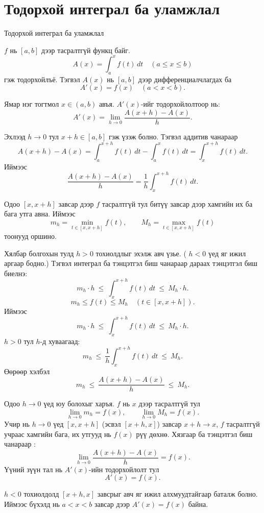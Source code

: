 \section{Тодорхой интеграл ба уламжлал}
\begin{frame}[allowframebreaks]{Тодорхой интеграл ба уламжлал}
\begin{theorem}
$f$ нь $[a,b]$ дээр тасралтгүй функц байг. 
\[
A(x)=\int_a^x f(t)\,dt \quad (a\le x\le b)
\]
гэж тодорхойлъё. Тэгвэл $A(x)$ нь $[a,b]$ дээр дифференциалчлагдах ба
\[
A'(x)=f(x)\quad (a<x<b).
\]
\end{theorem}

\begin{prof}
Ямар нэг тогтмол $x\in(a,b)$ авъя. $A'(x)$-ийг тодорхойлолтоор нь:
\[
A'(x)=\lim_{h\to0}\frac{A(x+h)-A(x)}{h}.
\]

Эхлээд $h\to 0$ тул $x+h\in[a,b]$ гэж үзэж болно. Тэгвэл аддитив чанараар
\[
A(x+h)-A(x)
= \int_a^{x+h} f(t)\,dt - \int_a^x f(t)\,dt
= \int_x^{x+h} f(t)\,dt.
\]
Иймээс
\[
\frac{A(x+h)-A(x)}{h}
=
\frac{1}{h}\int_x^{x+h} f(t)\,dt.
\]

Одоо $[x,x+h]$ завсар дээр $f$ тасралтгүй тул битүү завсар дээр хамгийн их ба бага утга авна. Иймээс
\[
m_h=\min_{t\in[x,x+h]} f(t),\qquad M_h=\max_{t\in[x,x+h]} f(t)
\]
тоонууд оршино.

Хялбар болгохын тулд $h>0$ тохиолдлыг эхэлж авч үзье. ( $h<0$ үед яг ижил аргаар бодно.) Тэгвэл интеграл ба тэнцэтгэл биш чанараар дараах тэнцэтгэл биш биелнэ:
\[
m_h\cdot h
\ \le\
\int_x^{x+h} f(t)\,dt
\ \le\
M_h\cdot h.
\]
\[
m_h \le f(t)\le M_h \quad (t\in[x,x+h]).
\]
Иймээс
\[
m_h\cdot h
\ \le\
\int_x^{x+h} f(t)\,dt
\ \le\
M_h\cdot h.
\]
$h>0$ тул $h$-д хуваагаад:
\[
m_h
\ \le\
\frac{1}{h}\int_x^{x+h} f(t)\,dt
\ \le\
M_h.
\]
Өөрөөр хэлбэл
\[
m_h
\ \le\
\frac{A(x+h)-A(x)}{h}
\ \le\
M_h.
\]

Одоо $h\to0$ үед юу болохыг харъя. $f$ нь $x$ дээр тасралтгүй тул
\[
\lim_{h\to0} m_h = f(x),\qquad \lim_{h\to0} M_h = f(x).
\]
Учир нь $h\to0$ үед $[x,x+h]$ (эсвэл $[x+h,x]$) завсар $x+h\to x$,   $f$ тасралтгүй учраас хамгийн бага, их утгууд нь $f(x)$ рүү дөхнө.
Хязгаар ба тэнцэтгэл биш чанараар :
\[
\lim_{h\to0}\frac{A(x+h)-A(x)}{h} = f(x).
\]
Үүний зүүн тал нь $A'(x)$-ийн тодорхойлолт тул
\[
A'(x)=f(x).
\]

$h<0$ тохиолдолд $[x+h,x]$ завсрыг авч яг ижил алхмуудтайгаар баталж болно. Иймээс бүхэлд нь $a<x<b$ завсар дээр $A'(x)=f(x)$ байна.
\end{prof}
\end{frame}

